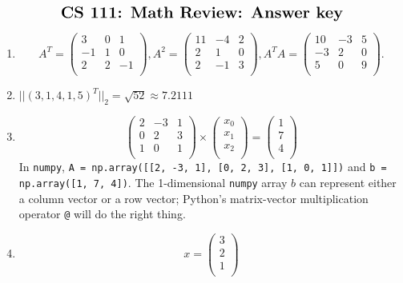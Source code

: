 \documentclass[11pt]{article}
\newcommand{\numpy}{{\tt numpy}}    %
\begin{document}
$$\mbox{\Large \bf CS 111: Math Review: Answer key} $$

\medskip


\begin{enumerate}

\item
$$ 
A^T = \left(
\begin{array}{ccc}
3 & 0 & 1 \\ 	
-1 & 1 & 0 \\ 
2 & 2 & -1 \\
\end{array} 
\right),
A^2 = \left(
\begin{array}{ccc}
11 & -4 & 2 \\
2 & 1 & 0 \\ 
2 & -1 & 3 \\
\end{array} 
\right),
A^TA = \left(
\begin{array}{ccc}
10 & -3 & 5 \\
-3 & 2 & 0 \\
5 & 0 & 9 \\
\end{array} 
\right).
$$

\item
$||(3,1,4,1,5)^T||_2 = \sqrt{52} \approx 7.2111$

\item
$$
\left(
\begin{array}{ccc}
2 & -3 & 1 \\
0 & 2 & 3 \\ 
1 & 0 & 1 \\
\end{array} 
\right) 
\times
\left(
\begin{array}{c}
 x_0 \\
 x_1 \\ 
 x_2 \\
\end{array} 
\right) 
=
\left(
\begin{array}{c}
 1 \\
 7 \\ 
 4 \\
\end{array} 
\right) 
$$
In \numpy, {\tt A = np.array([[2, -3, 1], [0, 2, 3], [1, 0, 1]])}
and {\tt b = np.array([1, 7, 4])}.
The 1-dimensional {\tt numpy} array $b$ can represent either a
column vector or a row vector; Python's matrix-vector multiplication
operator {\tt @} will do the right thing.

\item
$$x = 
\left(
\begin{array}{c}
 3 \\
 2 \\ 
 1 \\
\end{array} 
\right) 
$$


\end{enumerate}
\end{document}
